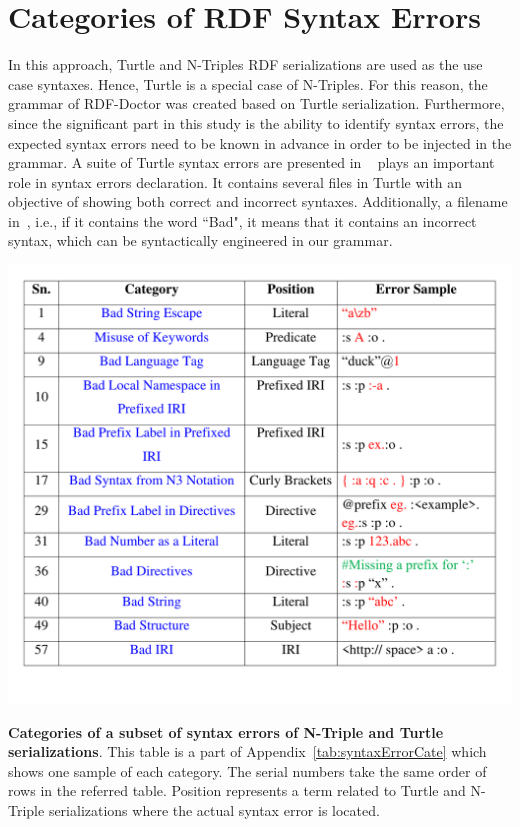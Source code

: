 \section{Categories of RDF Syntax Errors}

In this approach, Turtle and N-Triples RDF serializations are used as the use case syntaxes. 
Hence, Turtle is a special case of N-Triples. For this reason, the grammar of RDF-Doctor was created based on Turtle serialization. 
Furthermore, since the significant part in this study is the ability to identify syntax errors, the expected syntax errors need to be known in advance in order to be injected in the grammar. 
A suite of Turtle syntax errors are presented in ~\cite{TurtleTests:Online} plays an important role in syntax errors declaration. It contains several files in Turtle with an objective of showing both correct and incorrect syntaxes. Additionally, a filename in~\cite{TurtleTests:Online}, i.e., if it contains the word ``Bad", it means that it contains an incorrect syntax, which can be syntactically engineered in our grammar.

 \begin{table}[tbp]
 	\centering
\includegraphics[width=5.5in]{images/TrimmedBigTable.pdf}
		\setlength\abovecaptionskip{-10mm}
	\caption{\textbf{Categories of a subset of syntax errors of N-Triple and Turtle serializations}.
	This table is a part of Appendix~\ref{tab:syntaxErrorCate} which shows one sample of each category. The serial numbers take the same order of rows in the referred table. 
	Position represents a term related to Turtle and N-Triple serializations where the actual syntax error is located.}
	\label{tab:trimmedTable}
\end{table}


